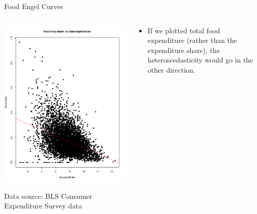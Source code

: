 \begin{frame}{Food Engel Curves}
\begin{columns}
\begin{column}{0.5\textwidth}
	\includegraphics[width=.7\textwidth]{engle1.pdf}	

{\tiny Data source: BLS Consumer Expenditure Survey data}

\end{column}
\begin{column}{0.5\textwidth}
\begin{itemize}
	\item If we plotted total food expenditure (rather than the expenditure share), the heteroscedasticity would go in the other direction.
\end{itemize}
\end{column}
\end{columns}
\end{frame}



